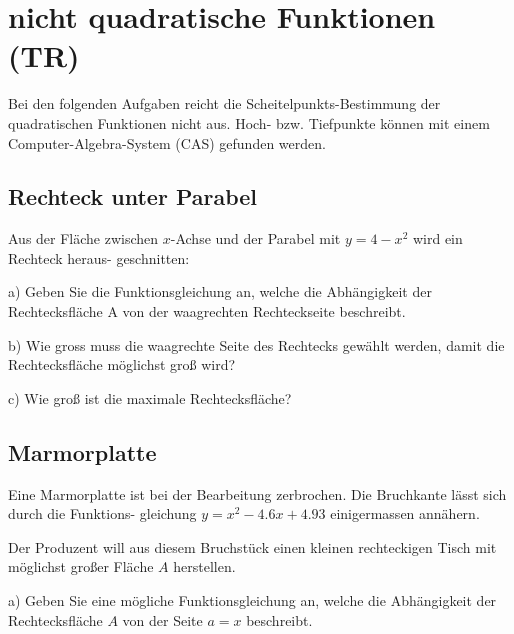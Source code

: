 \section{nicht quadratische Funktionen (TR)}
Bei den folgenden Aufgaben reicht die Scheitelpunkts-Bestimmung der
quadratischen Funktionen nicht aus. Hoch- bzw. Tiefpunkte können mit
einem Computer-Algebra-System (CAS) gefunden werden.

\subsection{Rechteck unter Parabel}

Aus der Fläche zwischen $x$-Achse und der
Parabel mit $y=4-x^2$ wird ein Rechteck heraus-
geschnitten:

a) 
Geben Sie die Funktionsgleichung an,
welche die Abhängigkeit der Rechtecksfläche A von der waagrechten
Rechteckseite beschreibt.

b) 
Wie gross muss die waagrechte Seite des
Rechtecks gewählt werden, damit die
Rechtecksfläche möglichst groß wird?

c)
Wie groß ist die maximale Rechtecksfläche?

\subsection{Marmorplatte}

Eine Marmorplatte ist bei der Bearbeitung zerbrochen. Die Bruchkante lässt sich durch die Funktions-
gleichung $y=x^2 - 4.6x + 4.93$ einigermassen annähern.

Der Produzent will aus diesem Bruchstück einen kleinen rechteckigen Tisch mit möglichst großer
Fläche $A$ herstellen.


a)
Geben Sie eine mögliche Funktionsgleichung an, welche die Abhängigkeit
der Rechtecksfläche $A$ von der Seite $a=x$ beschreibt.

